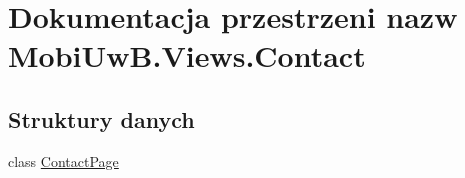 \hypertarget{a00277}{}\section{Dokumentacja przestrzeni nazw Mobi\+Uw\+B.\+Views.\+Contact}
\label{a00277}
\subsection*{Struktury danych}
\begin{DoxyCompactItemize}
\item 
class \hyperlink{a00014}{Contact\+Page}
\end{DoxyCompactItemize}
